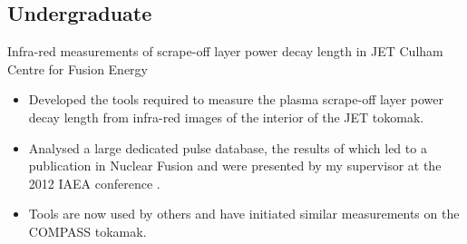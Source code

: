 \documentclass[11pt,a4paper,sans]{moderncv}        %
\begin{document}
\subsection{Undergraduate}
{Infra-red measurements of scrape-off layer power decay length in JET}
{\newline Culham Centre for Fusion Energy}{}{}
{\begin{itemize}%
\item Developed the tools required to measure the plasma scrape-off layer power decay length from infra-red images of the interior of the JET tokomak.
\item Analysed a large dedicated pulse database, the results of which led to a publication in Nuclear Fusion \cite{Arnoux2013} and were presented by my supervisor at the 2012 IAEA conference \cite{Arnoux2012}.
\item Tools are now used by others and have initiated similar measurements on the COMPASS tokamak.
\end{itemize}}

\nocite{*}
\end{document}
